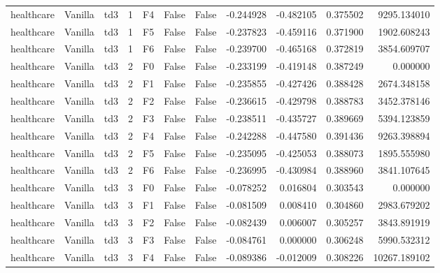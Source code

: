 \begin{tabular}{lllrlllrrrr}
healthcare & Vanilla &       td3 &     1 &  F4 &           False &            False & -0.244928 & -0.482105 & 0.375502 &      9295.134010 \\
healthcare & Vanilla &       td3 &     1 &  F5 &           False &            False & -0.237823 & -0.459116 & 0.371900 &      1902.608243 \\
healthcare & Vanilla &       td3 &     1 &  F6 &           False &            False & -0.239700 & -0.465168 & 0.372819 &      3854.609707 \\
healthcare & Vanilla &       td3 &     2 &  F0 &           False &            False & -0.233199 & -0.419148 & 0.387249 &         0.000000 \\
healthcare & Vanilla &       td3 &     2 &  F1 &           False &            False & -0.235855 & -0.427426 & 0.388428 &      2674.348158 \\
healthcare & Vanilla &       td3 &     2 &  F2 &           False &            False & -0.236615 & -0.429798 & 0.388783 &      3452.378146 \\
healthcare & Vanilla &       td3 &     2 &  F3 &           False &            False & -0.238511 & -0.435727 & 0.389669 &      5394.123859 \\
healthcare & Vanilla &       td3 &     2 &  F4 &           False &            False & -0.242288 & -0.447580 & 0.391436 &      9263.398894 \\
healthcare & Vanilla &       td3 &     2 &  F5 &           False &            False & -0.235095 & -0.425053 & 0.388073 &      1895.555980 \\
healthcare & Vanilla &       td3 &     2 &  F6 &           False &            False & -0.236995 & -0.430984 & 0.388960 &      3841.107645 \\
healthcare & Vanilla &       td3 &     3 &  F0 &           False &            False & -0.078252 &  0.016804 & 0.303543 &         0.000000 \\
healthcare & Vanilla &       td3 &     3 &  F1 &           False &            False & -0.081509 &  0.008410 & 0.304860 &      2983.679202 \\
healthcare & Vanilla &       td3 &     3 &  F2 &           False &            False & -0.082439 &  0.006007 & 0.305257 &      3843.891919 \\
healthcare & Vanilla &       td3 &     3 &  F3 &           False &            False & -0.084761 &  0.000000 & 0.306248 &      5990.532312 \\
healthcare & Vanilla &       td3 &     3 &  F4 &           False &            False & -0.089386 & -0.012009 & 0.308226 &     10267.189102 \\

\end{tabular}
